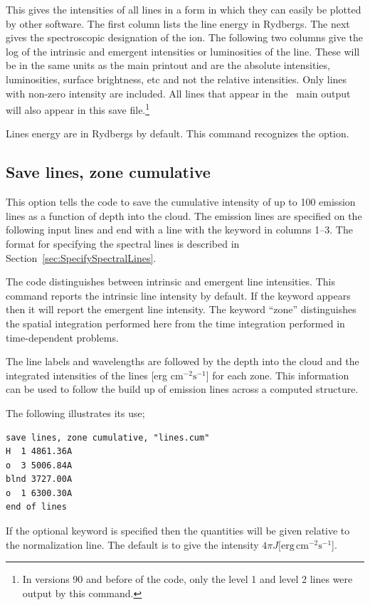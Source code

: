This gives the intensities of all lines in a form in which they can easily
be plotted by other software.  The first column lists the line energy in
Rydbergs.  The next gives the spectroscopic designation of the ion.  The
following two columns give the log of the intrinsic and emergent intensities
or luminosities of the line.  These will be in the same units as the main printout
and are the absolute intensities, luminosities, surface brightness, etc and not the 
relative intensities.
Only lines with non-zero intensity are included.
All lines that appear in the \Cloudy\ main output will also appear in
this save file.\footnote{In versions 90 and before of the code, only the level 1 and level
2 lines were output by this command.}

Lines energy are in Rydbergs by default.  This command recognizes the
 option.

\subsection{Save lines, zone cumulative}

This option tells the code to save the cumulative intensity
of up to 100 emission lines as a function of depth into the cloud.  The
emission lines are specified on the following input lines and end with a
line with the keyword  in columns 1--3.
The format for specifying the spectral lines is described in Section~\ref{sec:SpecifySpectralLines}.

The code distinguishes between intrinsic and emergent
line intensities.
This command reports the intrinsic line intensity by default.
If the keyword  appears then it will
report the emergent line intensity.
The keyword ``zone'' distinguishes the spatial integration performed
here from the time integration performed in time-dependent problems.

The line labels and wavelengths are followed by the depth into the cloud
and the integrated intensities of the lines [erg cm$^{-2} \mathrm{s}^{-1}$] for each zone.
This information can be used to follow the build up of emission lines across
a computed structure.

The following illustrates its use;
\begin{verbatim}
save lines, zone cumulative, "lines.cum"
H  1 4861.36A
o  3 5006.84A
blnd 3727.00A
o  1 6300.30A
end of lines
\end{verbatim}

If the optional keyword  is specified then the quantities will
be given relative to the normalization line. The default is to give
the intensity $4\pi J [\mathrm{erg\, cm}^{-2} \mathrm{s}^{-1}$].

